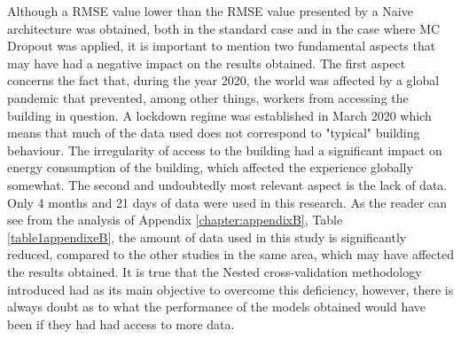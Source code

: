 Although a \ac{RMSE} value lower than the \ac{RMSE} value presented by a Naive architecture was obtained, both in the standard case and in the case where MC Dropout was applied, it is important to mention two fundamental aspects that may have had a negative impact on the results obtained. The first aspect concerns the fact that, during the year 2020, the world was affected by a global pandemic that prevented, among other things, workers from accessing the building in question. A lockdown regime was established in March 2020 which means that much of the data used does not correspond to "typical" building behaviour. The irregularity of access to the building had a significant impact on energy consumption of the building, which affected the experience globally somewhat. The second and undoubtedly most relevant aspect is the lack of data. Only 4 months and 21 days of data were used in this research. As the reader can see from the analysis of Appendix \ref{chapter:appendixB}, Table \ref{table1appendixeB}, the amount of data used in this study is significantly reduced, compared to the other studies in the same area, which may have affected the results obtained. It is true that the Nested cross-validation methodology introduced had as its main objective to overcome this deficiency, however, there is always doubt as to what the performance of the models obtained would have been if they had had access to more data.